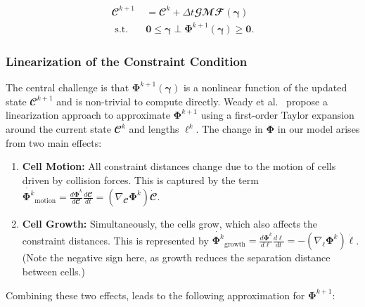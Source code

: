 \documentclass[conference]{IEEEtran}
\begin{document}
\begin{equation} \label{eq:colony_update_with_constraints}
    \begin{split}
        \mathbfcal{C}^{k+1} & = \mathbfcal{C}^k + \Delta t \mathbfcal{G} \mathbfcal{M} \mathbfcal{F}(\boldsymbol{\gamma})         \\
        \text{ s.t.} \quad  & \mathbf{0} \leq \boldsymbol{\gamma} \perp \mathbf{\Phi}^{k+1}(\boldsymbol{\gamma}) \geq \mathbf{0}.
    \end{split}
\end{equation}

\subsubsection{Linearization of the Constraint Condition}



The central challenge is that $\mathbf{\Phi}^{k+1}(\boldsymbol{\gamma})$ is a nonlinear function of the updated state $\mathbfcal{C}^{k+1}$ and is non-trivial to compute directly. Weady et al.~\cite{Weady2024SM} propose a linearization approach to approximate $\mathbf{\Phi}^{k+1}$ using a first-order Taylor expansion around the current state $\mathbfcal{C}^k$ and lengths $\boldsymbol{\ell}^k$. The change in $\mathbf{\Phi}$ in our model arises from two main effects:


\begin{enumerate}
    \item \textbf{Cell Motion:} All constraint distances change due to the motion of cells driven by collision forces. This is captured by the term $\dot{\mathbf{\Phi}^k}_{\text{motion}} = \frac{d \mathbf{\Phi}^k}{d \mathbfcal{C}} \frac{d \mathbfcal{C}}{dt} = (\nabla_{\mathbfcal{C}} \mathbf{\Phi}^k) \dot{\mathbfcal{C}}$.
    \item \textbf{Cell Growth:} Simultaneously, the cells grow, which also affects the constraint distances. This is represented by $\dot{\mathbf{\Phi}^k}_{\text{growth}} = \frac{d \mathbf{\Phi}^k}{d \boldsymbol{\ell}} \frac{d \boldsymbol{\ell}}{dt} =-(\nabla_{\boldsymbol{\ell}} \mathbf{\Phi}^k) \dot{\boldsymbol{\ell}}$. (Note the negative sign here, as growth reduces the separation distance between cells.)
\end{enumerate}

Combining these two effects, leads to the following approximation for $\mathbf{\Phi}^{k+1}$:
\end{document}
